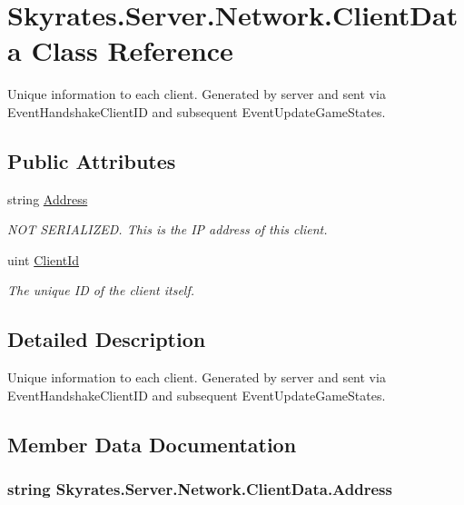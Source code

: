 \hypertarget{class_skyrates_1_1_server_1_1_network_1_1_client_data}{\section{Skyrates.\-Server.\-Network.\-Client\-Data Class Reference}
\label{class_skyrates_1_1_server_1_1_network_1_1_client_data}
}


Unique information to each client. Generated by server and sent via Event\-Handshake\-Client\-I\-D and subsequent Event\-Update\-Game\-States.  


\subsection*{Public Attributes}
\begin{DoxyCompactItemize}
\item 
string \hyperlink{class_skyrates_1_1_server_1_1_network_1_1_client_data_a09baae028286a5c98135e9a247d5c27c}{Address}
\begin{DoxyCompactList}\small\item\em N\-O\-T S\-E\-R\-I\-A\-L\-I\-Z\-E\-D. This is the I\-P address of this client. \end{DoxyCompactList}\item 
uint \hyperlink{class_skyrates_1_1_server_1_1_network_1_1_client_data_aac65d3f831d9663be5dc72fe934ac8ea}{Client\-Id}
\begin{DoxyCompactList}\small\item\em The unique I\-D of the client itself. \end{DoxyCompactList}\end{DoxyCompactItemize}


\subsection{Detailed Description}
Unique information to each client. Generated by server and sent via Event\-Handshake\-Client\-I\-D and subsequent Event\-Update\-Game\-States. 



\subsection{Member Data Documentation}
\hypertarget{class_skyrates_1_1_server_1_1_network_1_1_client_data_a09baae028286a5c98135e9a247d5c27c}{
\subsubsection[{Address}]{\setlength{\rightskip}{0pt plus 5cm}string Skyrates.\-Server.\-Network.\-Client\-Data.\-Address}}\label{class_skyrates_1_1_server_1_1_network_1_1_client_data_a09baae028286a5c98135e9a247d5c27c}


